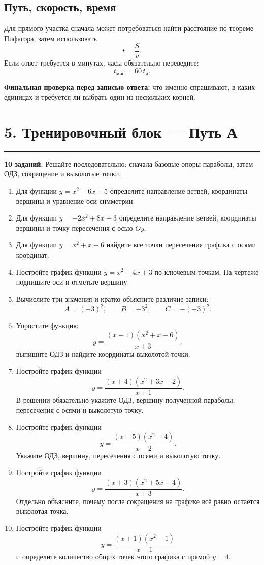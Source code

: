 \documentclass[a4paper,12pt]{article}
\newcommand{\sectionrule}{\vspace{-0.4em}\noindent\color{rulegray}\rule{\linewidth}{0.6pt}\color{textgray}\vspace{0.4em}}
\newcommand{\key}[1]{\textcolor{darkaccent}{\textbf{#1}}}
\begin{document}
\subsection*{Путь, скорость, время}
Для прямого участка сначала может потребоваться найти расстояние по теореме Пифагора, затем использовать
\[
  t=\frac{S}{v}.
\]
Если ответ требуется в минутах, часы обязательно переведите:
\[
  t_{\text{мин}}=60\,t_{\text{ч}}.
\]

\key{Финальная проверка перед записью ответа:} что именно спрашивают, в каких единицах и требуется ли выбрать один из нескольких корней.

\clearpage
\section*{5. Тренировочный блок — Путь А}
\sectionrule

\textbf{10 заданий.} Решайте последовательно: сначала базовые опоры параболы, затем ОДЗ, сокращение и выколотые точки.

{\small
\begin{enumerate}[itemsep=0.2em,topsep=0.25em]
  \item Для функции $y=x^2-6x+5$ определите направление ветвей, координаты вершины и уравнение оси симметрии.

  \item Для функции $y=-2x^2+8x-3$ определите направление ветвей, координаты вершины и точку пересечения с осью $Oy$.

  \item Для функции $y=x^2+x-6$ найдите все точки пересечения графика с осями координат.

  \item Постройте график функции $y=x^2-4x+3$ по ключевым точкам. На чертеже подпишите оси и отметьте вершину.

  \item Вычислите три значения и кратко объясните различие записи:
  \[
    A=(-3)^2,\qquad B=-3^2,\qquad C=-(-3)^2.
  \]

  \item Упростите функцию
  \[
    y=\frac{(x-1)(x^2+x-6)}{x+3},
  \]
  выпишите ОДЗ и найдите координаты выколотой точки.

  \item Постройте график функции
  \[
    y=\frac{(x+4)(x^2+3x+2)}{x+1}.
  \]
  В решении обязательно укажите ОДЗ, вершину полученной параболы, пересечения с осями и выколотую точку.

  \item Постройте график функции
  \[
    y=\frac{(x-5)(x^2-4)}{x-2}.
  \]
  Укажите ОДЗ, вершину, пересечения с осями и выколотую точку.

  \item Постройте график функции
  \[
    y=\frac{(x+3)(x^2+5x+4)}{x+3}.
  \]
  Отдельно объясните, почему после сокращения на графике всё равно остаётся выколотая точка.

  \item Постройте график функции
  \[
    y=\frac{(x+1)(x^2-1)}{x-1}
  \]
  и определите количество общих точек этого графика с прямой $y=4$.
\end{enumerate}
}
\end{document}
